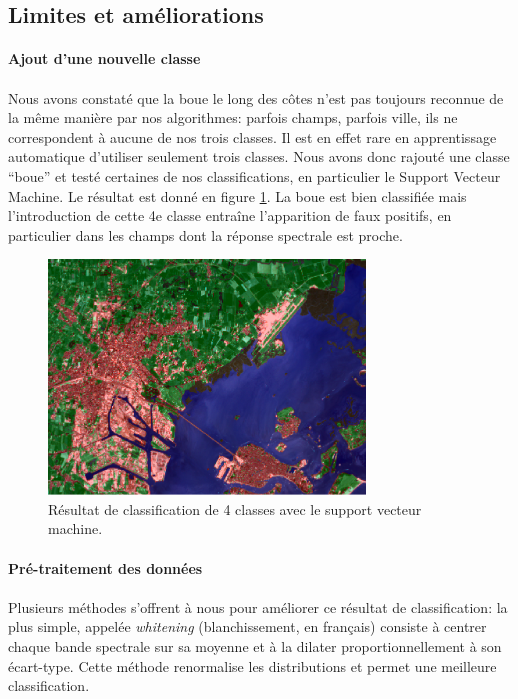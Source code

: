 \documentclass[a4paper,10pt]{article}
\begin{document}
\subsection{Limites et améliorations}

\paragraph{Ajout d'une nouvelle classe}
\paragraph{}
Nous avons constaté que la boue le long des côtes n'est pas toujours reconnue de la même manière par nos algorithmes: parfois champs, parfois ville, ils ne correspondent à aucune de nos trois classes. Il est en effet rare en apprentissage automatique d'utiliser seulement trois classes. Nous avons donc rajouté une classe ``boue'' et testé certaines de nos classifications, en particulier le Support Vecteur Machine. Le résultat est donné en figure \ref{fig:SVM4Cl}. La boue est bien classifiée mais l'introduction de cette 4e classe entraîne l'apparition de faux positifs, en particulier dans les champs dont la réponse spectrale est proche.
\begin{figure}[H]
  \centering
    \includegraphics[width=0.75\textwidth]{SVM4Classes}
  \caption{Résultat de classification de 4 classes avec le support vecteur machine.}
  \label{fig:SVM4Cl}
\end{figure}

\paragraph{Pré-traitement des données}
\paragraph{}
Plusieurs méthodes s'offrent à nous pour améliorer ce résultat de classification: la plus simple, appelée \textit{whitening} (blanchissement, en français) consiste à centrer chaque bande spectrale sur sa moyenne et à la dilater proportionnellement à son écart-type. Cette méthode renormalise les distributions et permet une meilleure classification.
\end{document}
